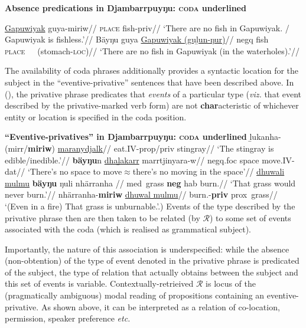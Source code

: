 \pex\textbf{Absence predications in Djambarrpuyŋu: \textsc{coda} underlined}\par\nobreak
\a\begingl\gla \ul{Gapuwiyak} guya-miriw//
\glb \textsc{place} fish-\gls{priv}//
\glft`There are no fish in Gapuwiyak. / Gapuwiyak is fishless.'//\endgl
\a\begingl\gla Bäyŋu guya \ul{Gapuwiyak (guḻun-ŋur)}//
\glb  \gls{negq} fish \textsc{place}~~~(stomach-\textsc{loc})//
\glft`There are no fish in Gapuwiyak (in the waterholes).'//\endgl\xe

\noindent The availability of coda phrases additionally provides a syntactic location for the subject in the ``eventive-privative'' sentences that have been described above. In (\nextx), the privative phrase predicates that \textit{events} of a particular type (\textit{viz.} that event described by the privative-marked verb form) are not \textbf{char}acteristic of whichever entity or location is specified in the coda position.


\pex \textbf{``Eventive-privatives'' in Djambarrpuyŋu: \textsc{coda} underlined}
\a \begingl\gla ḻukanha-(mirr/\textbf{miriw}) \ul{maranydjalk}//
\glb eat.\gls{IV}-\gls{prop}/\gls{priv} stingray//
\glft`The stingray is edible/inedible.'\trailingcitation{[AW~20190502]}//\endgl
\a\begingl\gla\textbf{bäyŋu}n \ul{dhaḻakarr} marrtjinyara-w//
\glb \gls{negq}.\gls{foc} space move.\gls{IV}-\gls{dat}//
\glft  `There's no space to move$\approx$there's no moving in the space'//\endgl
\a \begingl \gla \ul{dhuwali mulmu} \textbf{bäyŋu} ŋuli nhärranha //
\glb \gls{med}~grass \textbf{\gls{neg}} \gls{hab} burn.\IV//
\glft`That grass would never burn.'//\endgl
\a \begingl\gla nhärranha-\textbf{miriw} \ul{dhuwal mulmu}//
\glb burn.\IV-\textbf{\gls{priv}} \gls{prox}~grass//
\glft`(Even in a fire) That grass is unburnable.'.) Events of the type described by the privative phrase then are then taken to be related (by $ \mathcal R $) to some set of events associated with the coda (which is realised as grammatical subject).

Importantly, the nature of this association is underspecified: while the absence (non-obtention) of the type of event denoted in the privative phrase is predicated of the subject, the type of relation that actually obtains between the subject and this set of events is variable. Contextually-retrieived $ \mathcal R $ is locus of the (pragmatically ambiguous) modal reading of propositions containing an eventive-privative. As shown above, it can be interpreted as a relation of co-location, permission, speaker preference \textit{etc.}

